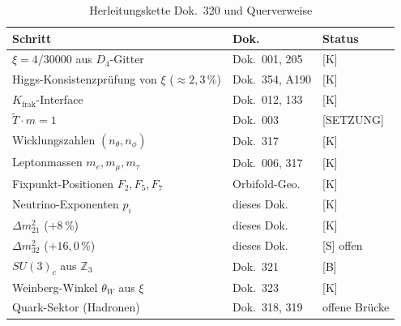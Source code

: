 \begin{table}[h]
\centering
\caption{Herleitungskette Dok.~320 und Querverweise}
\label{tab:querverweise}
\begin{tabular}{lll}
\toprule
Schritt & Dok. & Status \\
\midrule
$\xi = 4/30000$ aus $D_4$-Gitter          & Dok.~001, 205     & [K] \\
Higgs-Konsistenzprüfung von $\xi$ ($\approx 2{,}3\,\%$) & Dok.~354, A190 & [K] \\
$K_{\text{frak}}$-Interface                & Dok.~012, 133     & [K] \\
$\tilde{T}\cdot m = 1$                     & Dok.~003          & [SETZUNG] \\
Wicklungszahlen $(n_\theta, n_\phi)$       & Dok.~317          & [K] \\
Leptonmassen $m_e, m_\mu, m_\tau$          & Dok.~006, 317     & [K] \\
Fixpunkt-Positionen $F_2, F_5, F_7$        & Orbifold-Geo.     & [K] \\
Neutrino-Exponenten $p_i$                  & dieses Dok.       & [K] \\
$\Delta m_{21}^2$ ($+8\,\%$)              & dieses Dok.       & [K] \\
$\Delta m_{32}^2$ ($+16{,}0\,\%$)          & dieses Dok.       & [S] offen \\
$SU(3)_c$ aus $\mathbb{Z}_3$              & Dok.~321           & [B] \\
Weinberg-Winkel $\theta_W$ aus $\xi$       & Dok.~323          & [K] \\
Quark-Sektor (Hadronen)                    & Dok.~318, 319     & offene Brücke \\
\bottomrule
\end{tabular}
\end{table}
